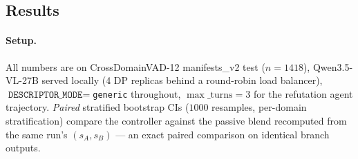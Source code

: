 \subsection{Results}
\label{ssec:ctrl_results}

\paragraph{Setup.} All numbers are on CrossDomainVAD-12 manifests\_v2
test ($n{=}1418$), Qwen3.5-VL-27B served locally (4 DP replicas
behind a round-robin load balancer), $\texttt{DESCRIPTOR\_MODE}=$\texttt{generic}
throughout, $\max\_\text{turns}=3$ for the refutation agent trajectory.
\emph{Paired} stratified bootstrap CIs ($1000$ resamples, per-domain
stratification) compare the controller against the passive blend recomputed from the
same run's $(s_A, s_B)$ --- an exact paired comparison on identical
branch outputs.

